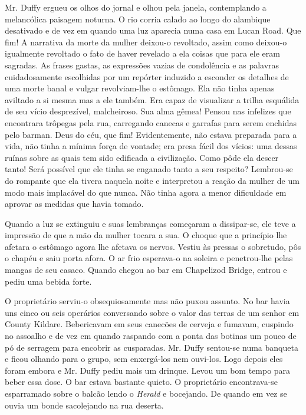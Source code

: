 Mr. Duffy ergueu os olhos do jornal e olhou pela janela, contemplando
a melancólica paisagem noturna. O rio corria calado ao longo do
alambique desativado e de vez em quando uma luz aparecia numa casa em
Lucan Road. Que fim! A narrativa da morte da mulher deixou-o
revoltado, assim como deixou-o igualmente revoltado o fato de
haver revelado a ela coisas que para ele eram sagradas. As frases
gastas, as expressões vazias de condolência e as palavras
cuidadosamente escolhidas por um repórter induzido a esconder os
detalhes de uma morte banal e vulgar revolviam-lhe o estômago. Ela não
tinha apenas aviltado a si mesma mas a ele também. Era capaz de
visualizar a trilha esquálida de seu vício desprezível, malcheiroso.
Sua alma gêmea! Pensou nas infelizes que encontrara trôpegas pela
rua, carregando canecas e garrafas para serem enchidas pelo barman.
Deus do céu, que fim! Evidentemente, não estava preparada para a vida,
não tinha a mínima força de vontade; era presa fácil dos vícios: uma
dessas ruínas sobre as quais tem sido edificada a civilização. Como
pôde ela descer tanto! Será possível que ele tinha se enganado
tanto a seu respeito? Lembrou-se do rompante que ela tivera naquela
noite e interpretou a reação da mulher de um modo mais implacável do
que nunca. Não tinha agora a menor dificuldade em aprovar as medidas
que havia tomado.

Quando a luz se extinguiu e suas lembranças começaram a dissipar-se,
ele teve a impressão de que a mão da mulher tocara a sua. O choque que
a princípio lhe afetara o estômago agora lhe afetava os nervos. Vestiu
às pressas o sobretudo, pôs o chapéu e saiu porta afora. O ar frio
esperava-o na soleira e penetrou-lhe pelas mangas de seu casaco.
Quando chegou ao bar em Chapelizod Bridge, entrou e pediu uma bebida
forte.

O proprietário serviu-o obsequiosamente mas não puxou assunto. No bar
havia uns cinco ou seis operários conversando sobre o valor das terras
de um senhor em County Kildare. Bebericavam em seus canecões de
cerveja e fumavam, cuspindo no assoalho e de vez em quando raspando
com a ponta das botinas um pouco de pó de serragem para encobrir as
cusparadas. Mr. Duffy
sentou-se numa banqueta e ficou olhando para o grupo, sem enxergá-los nem
ouvi-los. Logo depois eles foram embora e Mr. Duffy pediu mais um
drinque. Levou um bom tempo para beber essa dose. O bar estava
bastante quieto. O proprietário encontrava-se esparramado sobre o
balcão lendo o \textit{Herald} e bocejando. De quando em vez se ouvia um bonde
sacolejando na rua deserta.

